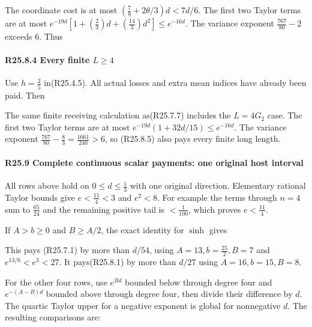 The coordinate cost is at most \((\frac{7}{8}+2\theta/3)d<7d/6\). The first two Taylor terms are at most \(e^{-19d}[1+(\frac{2}{3})d+(\frac{14}{3})d^2]\le e^{-16d}\). The variance exponent \(\frac{767}{80}-2\) exceeds 6. Thus


\paragraph{R25.8.4 Every finite \(L\ge 4\)}

Use \(h=\frac{2}{5}\) in(R25.4.5). All actual losses and extra mean indices have already been paid. Then


The same finite receiving calculation as(R25.7.7) includes the \(L=4 G_{2}\) case. The first two Taylor terms are at most \(e^{-19d}(1+32d/15)\le e^{-16d}\). The variance exponent \(\frac{767}{80}-\frac{8}{3}=\frac{1661}{240}>6\), so (R25.8.5) also pays every finite long length.

\paragraph{R25.9 Complete continuous scalar payments: one original host interval}\label{part:R25.9}

All rows above hold on \(0\le d\le \frac{1}{3}\) with one original direction. Elementary rational Taylor bounds give \(e<\frac{11}{4}<3\) and \(e^2<8\). For example the terms through \(n=4\) sum to \(\frac{65}{24}\) and the remaining positive tail is \(<\frac{1}{100}\), which proves \(e<\frac{11}{4}\).

If \(A>b\ge 0\) and \(B\ge A/2\), the exact identity for \(\sinh\) gives


This pays (R25.7.1) by more than \(d/54\), using \(A=13,\allowbreak \allowbreak  b=\frac{25}{2},\allowbreak \allowbreak  B=7\) and \(e^{13/6}<e^3<27\). It pays(R25.8.1) by more than \(d/27\) using \(A=16,\allowbreak \allowbreak  b=15,\allowbreak \allowbreak  B=8\).

For the other four rows, use \(e^{Bd}\) bounded below through degree four and \(e^{-(A-B)d}\) bounded above through degree four, then divide their difference by \(d\). The quartic Taylor upper for a negative exponent is global for nonnegative \(d\). The resulting comparisons are:

